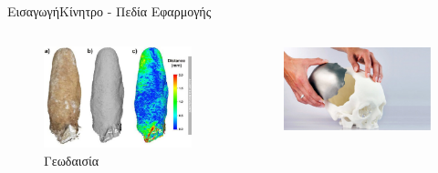 \documentclass[10pt]{beamer}
\begin{document}
\begin{frame}{Eισαγωγή}{Κίνητρο - Πεδία Εφαρμογής}
\begin{columns}
    
    \begin{figure}
        \centering
        \includegraphics[height=0.83\textwidth]{images/geodesic_field.jpg}
        \caption{Γεωδαισία}
        \label{fig:enter-label}
    \end{figure}
    \begin{figure}
        \centering
        \includegraphics[height=0.7\textwidth]{images/3D_printed_implants.jpg}

\end{figure}
\end{columns}
\end{frame}
\end{document}
